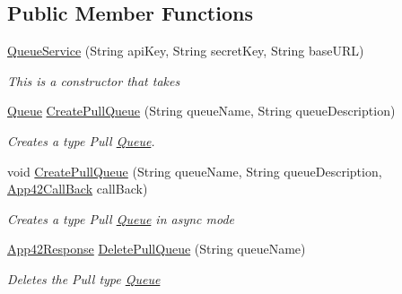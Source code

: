 \subsection*{Public Member Functions}
\begin{DoxyCompactItemize}
\item 
\hyperlink{classcom_1_1shephertz_1_1app42_1_1paas_1_1sdk_1_1csharp_1_1message_1_1_queue_service_aba4b4a63306c45ca58bd1488d8c2ea8d}{Queue\+Service} (String api\+Key, String secret\+Key, String base\+U\+R\+L)
\begin{DoxyCompactList}\small\item\em This is a constructor that takes \end{DoxyCompactList}\item 
\hyperlink{classcom_1_1shephertz_1_1app42_1_1paas_1_1sdk_1_1csharp_1_1message_1_1_queue}{Queue} \hyperlink{classcom_1_1shephertz_1_1app42_1_1paas_1_1sdk_1_1csharp_1_1message_1_1_queue_service_a51795e6a956c059d813e4fcaea52ef73}{Create\+Pull\+Queue} (String queue\+Name, String queue\+Description)
\begin{DoxyCompactList}\small\item\em Creates a type Pull \hyperlink{classcom_1_1shephertz_1_1app42_1_1paas_1_1sdk_1_1csharp_1_1message_1_1_queue}{Queue}. \end{DoxyCompactList}\item 
void \hyperlink{classcom_1_1shephertz_1_1app42_1_1paas_1_1sdk_1_1csharp_1_1message_1_1_queue_service_acedb50370f0585300565c808c4f7999a}{Create\+Pull\+Queue} (String queue\+Name, String queue\+Description, \hyperlink{interfacecom_1_1shephertz_1_1app42_1_1paas_1_1sdk_1_1csharp_1_1_app42_call_back}{App42\+Call\+Back} call\+Back)
\begin{DoxyCompactList}\small\item\em Creates a type Pull \hyperlink{classcom_1_1shephertz_1_1app42_1_1paas_1_1sdk_1_1csharp_1_1message_1_1_queue}{Queue} in async mode \end{DoxyCompactList}\item 
\hyperlink{classcom_1_1shephertz_1_1app42_1_1paas_1_1sdk_1_1csharp_1_1_app42_response}{App42\+Response} \hyperlink{classcom_1_1shephertz_1_1app42_1_1paas_1_1sdk_1_1csharp_1_1message_1_1_queue_service_ab3e4fef552d3a5a3e359fe19513ad8b9}{Delete\+Pull\+Queue} (String queue\+Name)
\begin{DoxyCompactList}\small\item\em Deletes the Pull type \hyperlink{classcom_1_1shephertz_1_1app42_1_1paas_1_1sdk_1_1csharp_1_1message_1_1_queue}{Queue} \end{DoxyCompactList}\item 

\end{DoxyCompactItemize}
